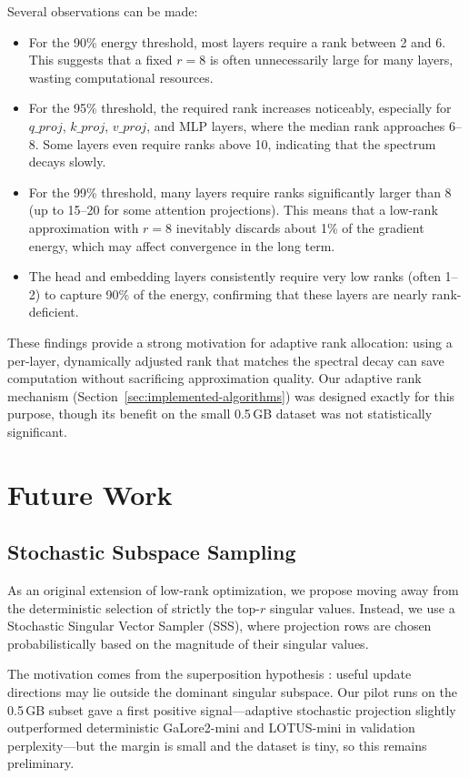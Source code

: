 \documentclass[conference]{IEEEtran}
\begin{document}
Several observations can be made:

\begin{itemize}
    \item For the 90\% energy threshold, most layers require a rank between 2 and 6. This suggests that a fixed \(r=8\) is often unnecessarily large for many layers, wasting computational resources.
    \item For the 95\% threshold, the required rank increases noticeably, especially for \(q\_proj\), \(k\_proj\), \(v\_proj\), and MLP layers, where the median rank approaches 6--8. Some layers even require ranks above 10, indicating that the spectrum decays slowly.
    \item For the 99\% threshold, many layers require ranks significantly larger than 8 (up to 15--20 for some attention projections). This means that a low-rank approximation with \(r=8\) inevitably discards about 1\% of the gradient energy, which may affect convergence in the long term.
    \item The head and embedding layers consistently require very low ranks (often 1--2) to capture 90\% of the energy, confirming that these layers are nearly rank-deficient.
\end{itemize}

These findings provide a strong motivation for adaptive rank allocation: using a per-layer, dynamically adjusted rank that matches the spectral decay can save computation without sacrificing approximation quality. Our adaptive rank mechanism (Section~\ref{sec:implemented-algorithms}) was designed exactly for this purpose, though its benefit on the small 0.5\,GB dataset was not statistically significant.

\section{Future Work}

\subsection{Stochastic Subspace Sampling}
As an original extension of low-rank optimization, we propose moving away from the deterministic selection of strictly the top-$r$ singular values. Instead, we use a Stochastic Singular Vector Sampler (SSS), where projection rows are chosen probabilistically based on the magnitude of their singular values.

The motivation comes from the superposition hypothesis \cite{olah_superposition}: useful update directions may lie outside the dominant singular subspace. Our pilot runs on the 0.5\,GB subset gave a first positive signal---adaptive stochastic projection slightly outperformed deterministic GaLore2-mini and LOTUS-mini in validation perplexity---but the margin is small and the dataset is tiny, so this remains preliminary.
\end{document}
